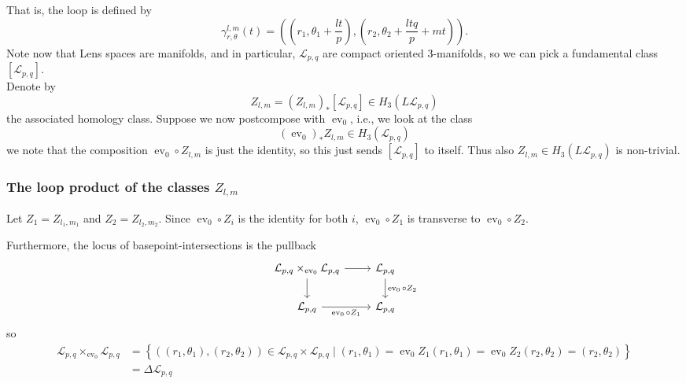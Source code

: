 \documentclass[reqno]{amsart}
\theoremstyle{definition}
\theoremstyle{remark}
\DeclareMathOperator{\ev}{ev}
\begin{document}
That is, the loop is defined by
\[
\gamma_{r, \theta}^{l,m}(t) = 
\left( \left( r_1, \theta_1 + \frac{lt}{p} \right) ,
\left( r_2, \theta_2 + \frac{lt q}{p} + 
mt\right) \right) .
\] 
Note now that Lens spaces are manifolds, and
in particular, $\mathcal{L}_{p,q}$ are compact oriented
$3$-manifolds, so we can pick a fundamental class
$\left[ \mathcal{L}_{p,q} \right] $.\\
Denote by
\[
Z_{l,m} = 
\left( Z_{l,m} \right)_*
\left[ \mathcal{L}_{p,q} \right] \in H_3 \left( L \mathcal{L}_{p,q} \right) 
\] 
the associated homology class.
Suppose we now
postcompose with $\ev_0$, i.e.,
we look at the class
\[
    \left( \ev_0 \right)_*
    Z_{l,m} \in 
H_3 \left( \mathcal{L}_{p,q} \right) 
\] 
we note that
the composition
$\ev_0 \circ Z_{l,m}$ is just the 
identity,
so this just sends
$\left[ \mathcal{L}_{p,q} \right] $ to itself.
Thus also $Z_{l,m} \in 
H_3 \left( L \mathcal{L}_{p,q} \right) $ is non-trivial.\\
\linebreak

\subsubsection{The loop product of the classes
$Z_{l,m}$}

Let $Z_1 = Z_{l_1, m_1}$ and
$Z_2 = Z_{l_2, m_2}$.
Since $\ev_0 \circ Z_i$ is the identity for both $i$,
$\ev_0 \circ Z_1$ is transverse to
$\ev_0 \circ Z_2$.

Furthermore, the locus of basepoint-intersections
is the pullback
\begin{equation*}
\begin{tikzcd}
    \mathcal{L}_{p,q} \times_{\ev_0} 
    \mathcal{L}_{p,q} \ar[r] \ar[d] & \mathcal{L}_{p,q} \ar[d, "
    \ev_0 \circ Z_2"] \\
    \mathcal{L}_{p,q} \ar[r, "\ev_0 \circ Z_1"'] & \mathcal{L}_{p,q}
\end{tikzcd}
\end{equation*}
so
\begin{align*}
    \mathcal{L}_{p,q} \times_{\ev_0} \mathcal{L}_{p,q}
    &= \left\{ \left( \left( r_1,\theta_1 \right) ,
        \left( r_2, \theta_2 \right) \right)  \in \mathcal{L}_{p,q} \times 
    \mathcal{L}_{p,q}  \mid 
    (r_1,\theta_1) = \ev_0 Z_1 (r_1, \theta_1) = \ev_0 Z_2 (r_2, \theta_2)
    = \left( r_2, \theta_2 \right) 
\right\}\\
    &= \Delta \mathcal{L}_{p,q}
\end{align*}
\end{document}
